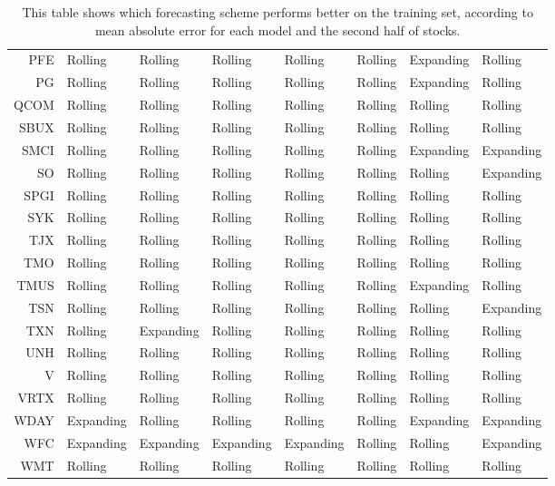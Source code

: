 \begin{table}[ht]
\begin{tabular}{rlllllll}
  PFE & Rolling & Rolling & Rolling & Rolling & Rolling & Expanding & Rolling \\ 
  PG & Rolling & Rolling & Rolling & Rolling & Rolling & Expanding & Rolling \\ 
  QCOM & Rolling & Rolling & Rolling & Rolling & Rolling & Rolling & Rolling \\ 
  SBUX & Rolling & Rolling & Rolling & Rolling & Rolling & Rolling & Rolling \\ 
  SMCI & Rolling & Rolling & Rolling & Rolling & Rolling & Expanding & Expanding \\ 
  SO & Rolling & Rolling & Rolling & Rolling & Rolling & Rolling & Expanding \\ 
  SPGI & Rolling & Rolling & Rolling & Rolling & Rolling & Rolling & Rolling \\ 
  SYK & Rolling & Rolling & Rolling & Rolling & Rolling & Rolling & Rolling \\ 
  TJX & Rolling & Rolling & Rolling & Rolling & Rolling & Rolling & Rolling \\ 
  TMO & Rolling & Rolling & Rolling & Rolling & Rolling & Rolling & Rolling \\ 
  TMUS & Rolling & Rolling & Rolling & Rolling & Rolling & Expanding & Rolling \\ 
  TSN & Rolling & Rolling & Rolling & Rolling & Rolling & Rolling & Expanding \\ 
  TXN & Rolling & Expanding & Rolling & Rolling & Rolling & Rolling & Rolling \\ 
  UNH & Rolling & Rolling & Rolling & Rolling & Rolling & Rolling & Rolling \\ 
  V & Rolling & Rolling & Rolling & Rolling & Rolling & Rolling & Rolling \\ 
  VRTX & Rolling & Rolling & Rolling & Rolling & Rolling & Rolling & Rolling \\ 
  WDAY & Expanding & Rolling & Rolling & Rolling & Rolling & Expanding & Expanding \\ 
  WFC & Expanding & Expanding & Expanding & Expanding & Rolling & Rolling & Expanding \\ 
  WMT & Rolling & Rolling & Rolling & Rolling & Rolling & Rolling & Rolling \\ 
   \hline
\end{tabular}
\caption[Better scheme MAE (2)]{This table shows which forecasting scheme performs better on the training set, according to mean absolute error
              for each model and the second half of stocks.} 
\label{Table:Better_MAE_2}
\end{table}
